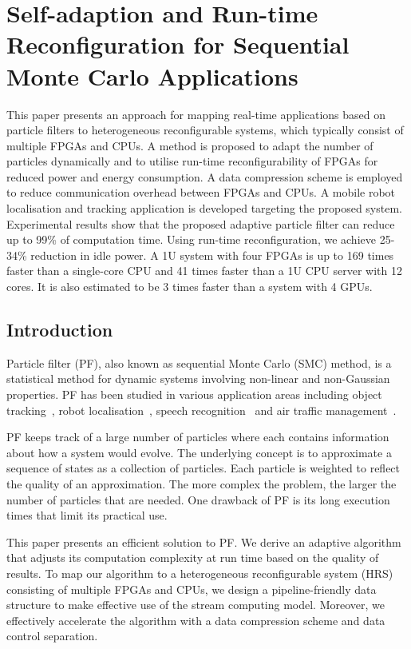 
\chapter[Self-adaption \& Run-time Reconfiguration for SMC Applications]{Self-adaption and Run-time Reconfiguration for Sequential Monte Carlo Applications}

This paper presents an approach for mapping real-time applications based on particle filters to heterogeneous reconfigurable systems, 
which typically consist of multiple FPGAs and CPUs. 
A method is proposed to adapt the number of particles dynamically and to utilise run-time reconfigurability of FPGAs for reduced power and energy consumption. 
A data compression scheme is employed to reduce communication overhead between FPGAs and CPUs.
A mobile robot localisation and tracking application is developed targeting the proposed system. 
Experimental results show that the proposed adaptive particle filter can reduce up to 99\% of computation time. 
Using run-time reconfiguration, we achieve 25-34\% reduction in idle power.
A 1U system with four FPGAs is up to 169 times faster than a single-core CPU and 41 times faster than a 1U CPU server with 12 cores.
It is also estimated to be 3 times faster than a system with 4 GPUs.

\section{Introduction}

Particle filter (PF), also known as sequential Monte Carlo (SMC) method, is a statistical method for dynamic systems involving non-linear and non-Gaussian properties. 
PF has been studied in various application areas including object tracking~\cite{happe11}, robot localisation~\cite{montemerlo02}, speech recognition~\cite{vermaak02} and air traffic management~\cite{eele11}.

PF keeps track of a large number of particles where each contains information about how a system would evolve.
The underlying concept is to approximate a sequence of states as a collection of particles.
Each particle is weighted to reflect the quality of an approximation.
The more complex the problem, the larger the number of particles that are needed.
One drawback of PF is its long execution times that limit its practical use.

This paper presents an efficient solution to PF.
We derive an adaptive algorithm that adjusts its computation complexity at run time based on the quality of results.
To map our algorithm to a heterogeneous reconfigurable system (HRS) consisting of multiple FPGAs and CPUs,
we design a pipeline-friendly data structure to make effective use of the stream computing model.
Moreover, we effectively accelerate the algorithm with a data compression scheme and data control separation.

